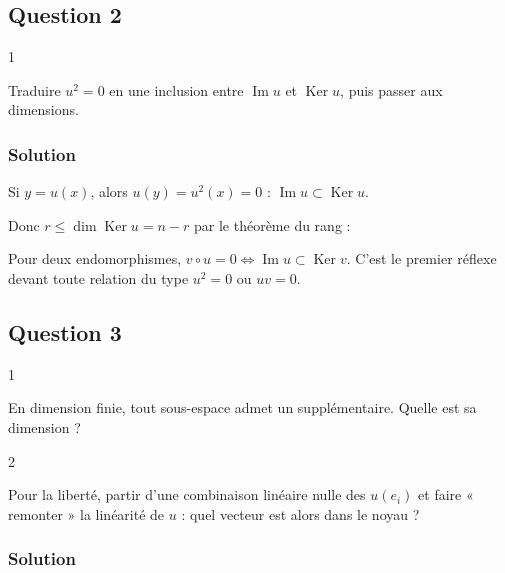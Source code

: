 \documentclass[11pt,a4paper]{article}
\newcommand{\equationajustee}[1]{%
  \sbox{\boiteequation}{$\displaystyle #1$}%
  \ifdim\wd\boiteequation>\linewidth
    \[\resizebox{\linewidth}{!}{\usebox{\boiteequation}}\]%
  \else
    \[#1\]%
  \fi}
\begin{document}
\hypertarget{question-2}{%
\subsection{Question 2}\label{question-2}}

\begin{indication}{1}

Traduire \(u^2=0\) en une inclusion entre \(\operatorname{Im}u\) et \(\operatorname{Ker}u\), puis passer aux dimensions.

\end{indication}

\hypertarget{solution-1}{%
\subsubsection{Solution}\label{solution-1}}

Si \(y=u(x)\), alors \(u(y)=u^2(x)=0\) : \(\operatorname{Im}u\subset\operatorname{Ker}u\).

Donc \(r\le\dim\operatorname{Ker}u=n-r\) par le théorème du rang :
\equationajustee{\boxed{r\le\frac n2.}}

\begin{methode}

Pour deux endomorphismes, \(v\circ u=0\iff\operatorname{Im}u\subset\operatorname{Ker}v\). C'est le premier réflexe devant toute relation du type \(u^2=0\) ou \(uv=0\).

\end{methode}

\hypertarget{question-3}{%
\subsection{Question 3}\label{question-3}}

\begin{indication}{1}

En dimension finie, tout sous-espace admet un supplémentaire. Quelle est sa dimension ?

\end{indication}

\begin{indication}{2}

Pour la liberté, partir d'une combinaison linéaire nulle des \(u(e_i)\) et faire « remonter » la linéarité de \(u\) : quel vecteur est alors dans le noyau ?

\end{indication}

\hypertarget{solution-2}{%
\subsubsection{Solution}\label{solution-2}}
\end{document}
